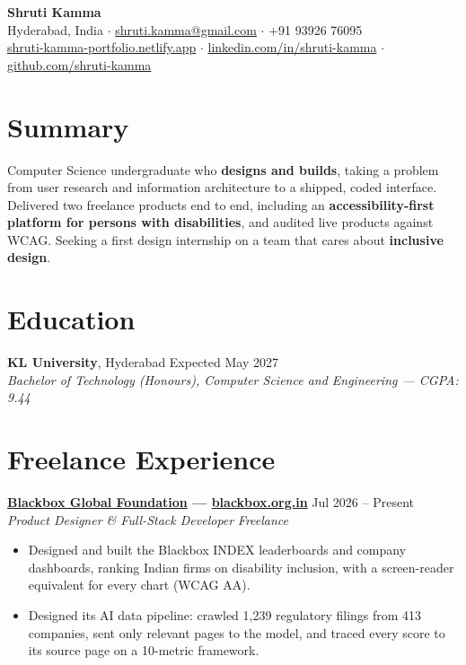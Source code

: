 \documentclass[11pt,letterpaper]{article}
\newcommand{\role}[4]{%
	\noindent\textbf{#1} \hfill #2\\
	\textit{#3} \hfill \textit{#4}
}
\begin{document}
\begin{center}
	{\LARGE \textbf{Shruti Kamma}}\\[4pt]
	Hyderabad, India \quad $\cdot$ \quad \href{mailto:shruti.kamma@gmail.com}{shruti.kamma@gmail.com} \quad $\cdot$ \quad +91 93926 76095\\
	\href{https://shruti-kamma-portfolio.netlify.app}{shruti-kamma-portfolio.netlify.app} \quad $\cdot$ \quad
	\href{https://www.linkedin.com/in/shruti-kamma-71bb35312/}{linkedin.com/in/shruti-kamma} \quad $\cdot$ \quad
	\href{https://github.com/shruti-kamma}{github.com/shruti-kamma}
\end{center}

\section*{Summary}
Computer Science undergraduate who \textbf{designs and builds}, taking a problem from user research and information architecture to a shipped, coded interface. Delivered two freelance products end to end, including an \textbf{accessibility-first platform for persons with disabilities}, and audited live products against WCAG. Seeking a first design internship on a team that cares about \textbf{inclusive design}.

\section*{Education}
\noindent\textbf{KL University}, Hyderabad \hfill Expected May 2027\\
\textit{Bachelor of Technology (Honours), Computer Science and Engineering --- CGPA: 9.44}

\section*{Freelance Experience}

\role{\href{https://blackbox.org.in}{Blackbox Global Foundation} --- \href{https://blackbox.org.in}{\normalfont blackbox.org.in}}{Jul 2026 -- Present}{Product Designer \& Full-Stack Developer}{Freelance}
\begin{itemize}
	\item Designed and built the Blackbox INDEX\texttrademark{} leaderboards and company dashboards, ranking Indian firms on disability inclusion, with a screen-reader equivalent for every chart (WCAG AA).
	\item Designed its AI data pipeline: crawled 1,239 regulatory filings from 413 companies, sent only relevant pages to the model, and traced every score to its source page on a 10-metric framework.
\end{itemize}
\end{document}

